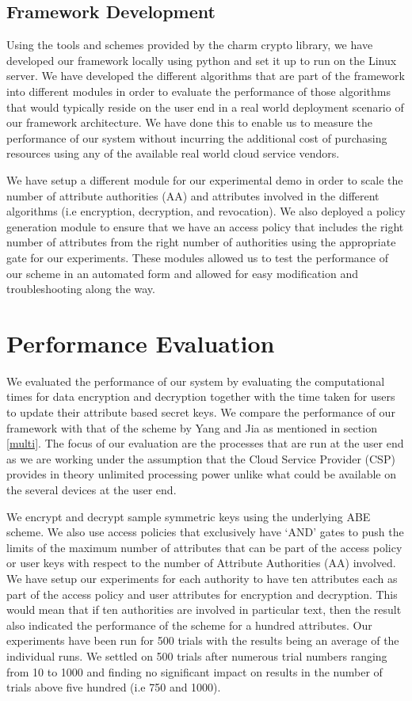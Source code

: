 \subsection{Framework Development}

Using the tools and schemes provided by the charm crypto library, we have developed our framework locally using python and set it up to run on the Linux server. We have developed the different algorithms that are part of the framework into different modules in order to evaluate the performance of those algorithms that would typically reside on the user end in a real world deployment scenario of our framework architecture. We have done this to enable us to measure the performance of our system without incurring the additional cost of purchasing resources using any of the available real world cloud service vendors.

We have setup a different module for our experimental demo in order to scale the number of attribute authorities (AA) and attributes involved in the different algorithms (i.e encryption, decryption, and revocation). We also deployed a policy generation module to ensure that we have an access policy that includes the right number of attributes from the right number of authorities using the appropriate gate for our experiments. These modules allowed us to test the performance of our scheme in an automated form and allowed for easy modification and troubleshooting along the way.

\section{Performance Evaluation}

We evaluated the performance of our system by evaluating the computational times for data encryption and decryption together with the time taken for users to update their attribute based secret keys. We compare the performance of our framework with that of the scheme by Yang and Jia \cite{Yang2014} as mentioned in section \ref{multi}. The focus of our evaluation are the processes that are run at the user end as we are working under the assumption that the Cloud Service Provider (CSP) provides in theory unlimited processing power unlike what could be available on the several devices at the user end.

We encrypt and decrypt sample symmetric keys using the underlying ABE scheme. We also use access policies that exclusively have `AND' gates to push the limits of the maximum number of attributes that can be part of the access policy or user keys with respect to the number of Attribute Authorities (AA) involved. We have setup our experiments for each authority to have ten attributes each as part of the access policy and user attributes for encryption and decryption. This would mean that if ten authorities are involved in particular text, then the result also indicated the performance of the scheme for a hundred attributes. Our experiments have been run for 500 trials with the results being an average of the individual runs. We settled on 500 trials after numerous trial numbers ranging from 10 to 1000 and finding no significant impact on results in the number of trials above five hundred (i.e 750 and 1000).


